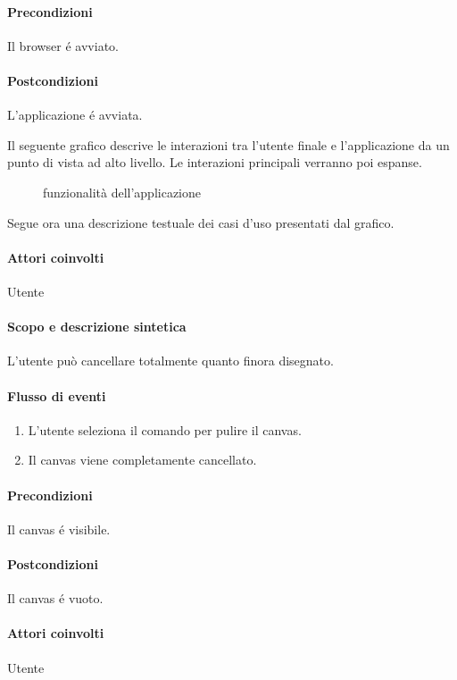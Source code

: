 \paragraph{Precondizioni} Il browser \'e avviato.
\paragraph{Postcondizioni} L'applicazione \'e avviata.

Il seguente grafico descrive le interazioni tra l'utente finale e l'applicazione da un punto di vista ad alto livello. Le interazioni principali verranno poi espanse.
\begin{figure}[!ht]
\centering
\vspace{20pt} 
\caption{funzionalit\`a dell'applicazione}
\end{figure}

Segue ora una descrizione testuale dei casi d'uso presentati dal grafico.

\paragraph{Attori coinvolti} Utente
\paragraph{Scopo e descrizione sintetica}
L'utente pu\`o cancellare totalmente quanto finora disegnato.
\paragraph{Flusso di eventi}
\begin{enumerate}
\item L'utente seleziona il comando per pulire il canvas. 
\item Il canvas viene completamente cancellato.
\end{enumerate}
\paragraph{Precondizioni} Il canvas \'e visibile.
\paragraph{Postcondizioni} Il canvas \'e vuoto.

\paragraph{Attori coinvolti} Utente
